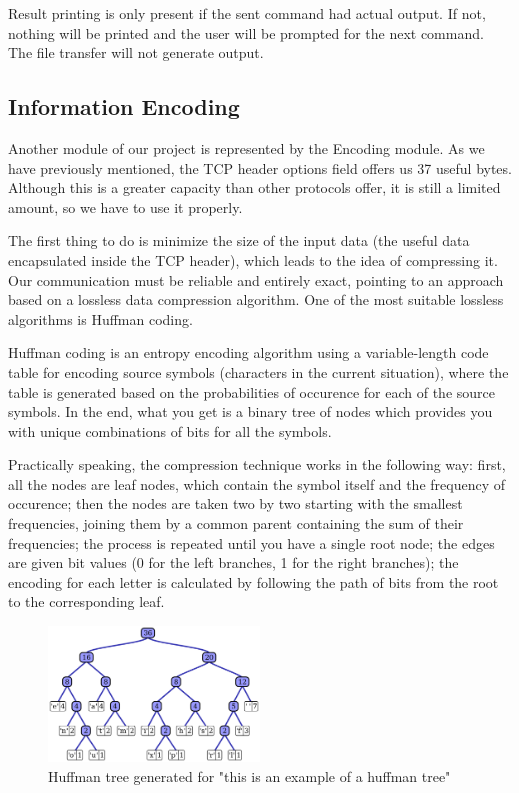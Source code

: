 Result printing is only present if the sent command had actual output. If not, nothing will
be printed and the user will be prompted for the next command. The file transfer will not 
generate output.



\subsection{Information Encoding}

Another module of our project is represented by the Encoding module. As we
have previously mentioned, the TCP header options field offers us 37 useful
bytes. Although this is a greater capacity than other protocols offer, it is
still a limited amount, so we have to use it properly.

The first thing to do is minimize the size of the input data (the useful
data encapsulated inside the TCP header), which leads to the idea of compressing
it. Our communication must be reliable and entirely exact, pointing to an
approach based on a lossless data compression algorithm. One of the most
suitable lossless algorithms is Huffman coding.

Huffman coding\cite{huffman1952method} is an entropy encoding algorithm using
a variable-length code table for encoding source symbols (characters in the
current situation), where the table is generated based on the probabilities of
occurence for each of the source symbols. In the end, what you get is a binary
tree of nodes which provides you with unique combinations of bits for all the
symbols.

Practically speaking, the compression technique works in the following way:
first, all the nodes are leaf nodes, which contain the symbol itself and the
frequency of occurence; then the nodes are taken two by two starting with the
smallest frequencies, joining them by a common parent containing the sum of
their frequencies; the process is repeated until you have a single root node;
the edges are given bit values (0 for the left branches, 1 for the right branches);
the encoding for each letter is calculated by following the path of bits from
the root to the corresponding leaf.

\begin{figure}
  \centering
  \includegraphics[width=0.5\textwidth]{img/huffman}
  \caption{Huffman tree generated for "this is an example of a huffman tree"}
  \label{fig:huffman}
\end{figure}

